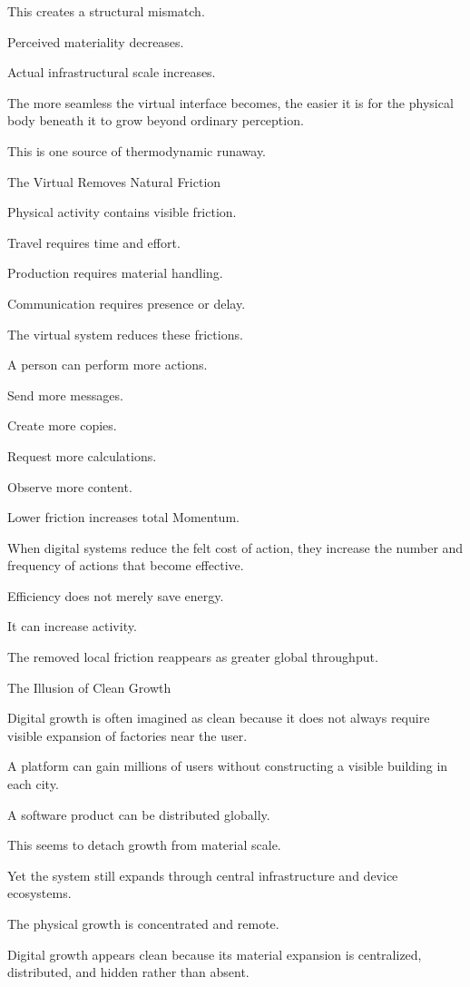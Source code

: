 This creates a structural mismatch.

Perceived materiality decreases.

Actual infrastructural scale increases.

The more seamless the virtual interface becomes, the easier it is for the physical body beneath it to grow beyond ordinary perception.

This is one source of thermodynamic runaway.

The Virtual Removes Natural Friction

Physical activity contains visible friction.

Travel requires time and effort.

Production requires material handling.

Communication requires presence or delay.

The virtual system reduces these frictions.

A person can perform more actions.

Send more messages.

Create more copies.

Request more calculations.

Observe more content.

Lower friction increases total Momentum.

When digital systems reduce the felt cost of action, they increase the number and frequency of actions that become effective.

Efficiency does not merely save energy.

It can increase activity.

The removed local friction reappears as greater global throughput.

The Illusion of Clean Growth

Digital growth is often imagined as clean because it does not always require visible expansion of factories near the user.

A platform can gain millions of users without constructing a visible building in each city.

A software product can be distributed globally.

This seems to detach growth from material scale.

Yet the system still expands through central infrastructure and device ecosystems.

The physical growth is concentrated and remote.

Digital growth appears clean because its material expansion is centralized, distributed, and hidden rather than absent.

